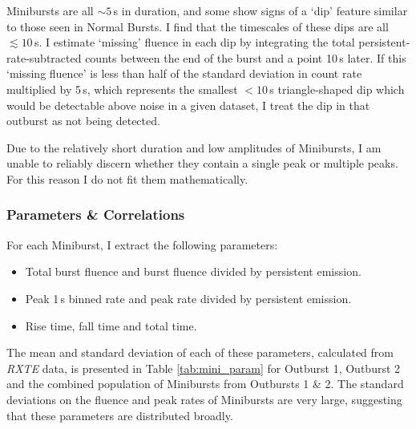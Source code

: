 \par Minibursts are all $\sim5$\,s in duration, and some show signs of a `dip' feature similar to those seen in Normal Bursts.  I find that the timescales of these dips are all $\lesssim10$\,s.  I estimate `missing' fluence in each dip by integrating the total persistent-rate-subtracted counts between the end of the burst and a point 10\,s later.  If this `missing fluence' is less than half of the standard deviation in count rate multiplied by 5\,s, which represents the smallest $<10$\,s triangle-shaped dip which would be detectable above noise in a given dataset, I treat the dip in that outburst as not being detected.
\par Due to the relatively short duration and low amplitudes of Minibursts, I am unable to reliably discern whether they contain a single peak or multiple peaks.  For this reason I do not fit them mathematically.

\subsubsection{Parameters \& Correlations}

\label{sec:ministruc}

\par For each Miniburst, I extract the following parameters:

\begin{itemize}
\item Total burst fluence and burst fluence divided by persistent emission.
\item Peak 1\,s binned rate and peak rate divided by persistent emission.
\item Rise time, fall time and total time.
\end{itemize}
The mean and standard deviation of each of these parameters, calculated from \indexrxte\textit{RXTE} data, is presented in Table \ref{tab:mini_param} for Outburst 1, Outburst 2 and the combined population of Minibursts from Outbursts 1 \& 2.  The standard deviations on the fluence and peak rates of Minibursts are very large, suggesting that these parameters are distributed broadly.

